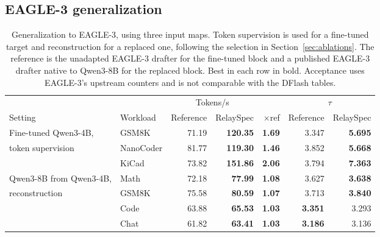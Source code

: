 \subsection{EAGLE-3 generalization}
\label{app:eagle-table}
\begin{table}[t]
\centering
\caption{Generalization to EAGLE-3, using three input maps. Token supervision is used for a fine-tuned target and reconstruction for a replaced one, following the selection in Section~\ref{sec:ablations}. The reference is the unadapted EAGLE-3 drafter for the fine-tuned block and a published EAGLE-3 drafter native to Qwen3-8B for the replaced block. Best in each row in bold. Acceptance uses EAGLE-3's upstream counters and is not comparable with the DFlash tables.}
\label{tab:eagle}
\small
\begin{tabular}{llrrrrr}
\toprule
& & \multicolumn{2}{c}{Tokens/s} & & \multicolumn{2}{c}{$\tau$} \\
\cmidrule(lr){3-4}\cmidrule(lr){6-7}
Setting & Workload & Reference & RelaySpec & $\times$ref & Reference & RelaySpec \\
\midrule
Fine-tuned Qwen3-4B, & GSM8K & 71.19 & \textbf{120.35} & \textbf{1.69} & 3.347 & \textbf{5.695} \\
token supervision & NanoCoder & 81.77 & \textbf{119.30} & \textbf{1.46} & 3.852 & \textbf{5.668} \\
 & KiCad & 73.82 & \textbf{151.86} & \textbf{2.06} & 3.794 & \textbf{7.363} \\
\midrule
Qwen3-8B from Qwen3-4B, & Math & 72.18 & \textbf{77.99} & \textbf{1.08} & 3.627 & \textbf{3.638} \\
reconstruction & GSM8K & 75.58 & \textbf{80.59} & \textbf{1.07} & 3.713 & \textbf{3.840} \\
 & Code & 63.88 & \textbf{65.53} & \textbf{1.03} & \textbf{3.351} & 3.293 \\
 & Chat & 61.82 & \textbf{63.41} & \textbf{1.03} & \textbf{3.186} & 3.136 \\
\bottomrule
\end{tabular}
\end{table}


